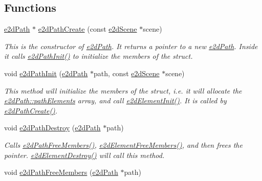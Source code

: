 \subsection*{Functions}
\begin{DoxyCompactItemize}
\item 
\hyperlink{structe2dPath}{e2d\-Path} $\ast$ \hyperlink{group__e2dPath_ga6f81c71700ebf86964ea7e4b28dea4fb}{e2d\-Path\-Create} (const \hyperlink{structe2dScene}{e2d\-Scene} $\ast$scene)
\begin{DoxyCompactList}\small\item\em This is the constructor of \hyperlink{structe2dPath}{e2d\-Path}. It returns a pointer to a new \hyperlink{structe2dPath}{e2d\-Path}. Inside it calls \hyperlink{group__e2dPath_ga18e88821996913d4304096af0dda07e8}{e2d\-Path\-Init()} to initialize the members of the struct. \end{DoxyCompactList}\item 
void \hyperlink{group__e2dPath_ga18e88821996913d4304096af0dda07e8}{e2d\-Path\-Init} (\hyperlink{structe2dPath}{e2d\-Path} $\ast$path, const \hyperlink{structe2dScene}{e2d\-Scene} $\ast$scene)
\begin{DoxyCompactList}\small\item\em This method will initialize the members of the struct, i.\-e. it will allocate the \hyperlink{structe2dPath_ac0c8a45ff4f8d02e557fb33887743439}{e2d\-Path\-::path\-Elements} array, and call \hyperlink{group__e2dElement_ga8734d10ef40a380dfc51bfe1790a92a7}{e2d\-Element\-Init()}. It is called by \hyperlink{group__e2dPath_ga6f81c71700ebf86964ea7e4b28dea4fb}{e2d\-Path\-Create()}. \end{DoxyCompactList}\item 
void \hyperlink{group__e2dPath_ga92e9e63b2307a2fbe9cfa564852e98a7}{e2d\-Path\-Destroy} (\hyperlink{structe2dPath}{e2d\-Path} $\ast$path)
\begin{DoxyCompactList}\small\item\em Calls \hyperlink{group__e2dPath_gad6343de48f1c4ee1ce2bf1a1562dda88}{e2d\-Path\-Free\-Members()}, \hyperlink{group__e2dElement_gae8da5104d70a09549ca74044dda8313c}{e2d\-Element\-Free\-Members()}, and then frees the pointer. \hyperlink{group__e2dElement_ga214c437a16fe6f3fc795539f851a2019}{e2d\-Element\-Destroy()} will call this method. \end{DoxyCompactList}\item 
void \hyperlink{group__e2dPath_gad6343de48f1c4ee1ce2bf1a1562dda88}{e2d\-Path\-Free\-Members} (\hyperlink{structe2dPath}{e2d\-Path} $\ast$path)

\end{DoxyCompactItemize}
